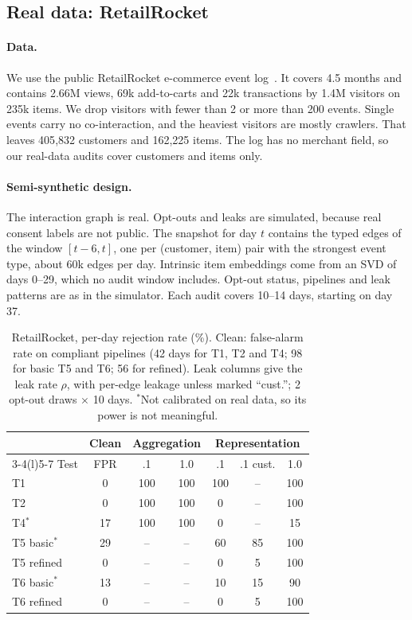 \documentclass[10pt,twocolumn,letterpaper]{article}
\theoremstyle{definition}
\begin{document}
\subsection{Real data: RetailRocket}\label{sec:real}
\paragraph{Data.}
We use the public RetailRocket e-commerce event log~\citep{retailrocket}. It
covers 4.5 months and contains 2.66M views, 69k add-to-carts and 22k
transactions by 1.4M visitors on 235k items. We drop visitors with fewer than
2 or more than 200 events. Single events carry no co-interaction, and the
heaviest visitors are mostly crawlers. That leaves 405{,}832 customers and
162{,}225 items. The log has no merchant field, so our real-data audits cover
customers and items only.

\paragraph{Semi-synthetic design.}
The interaction graph is real. Opt-outs and leaks are simulated, because real
consent labels are not public. The snapshot for day $t$ contains the typed edges
of the window $[t-6,t]$, one per (customer, item) pair with the strongest event
type, about 60k edges per day. Intrinsic item embeddings come from an SVD of
days 0--29, which no audit window includes. Opt-out status, pipelines and leak
patterns are as in the simulator. Each audit covers 10--14 days, starting on
day 37.

\begin{table}[t]
\centering\footnotesize
\setlength{\tabcolsep}{3pt}
\begin{tabular}{@{}lcccccc@{}}
\toprule
 & Clean & \multicolumn{2}{c}{Aggregation} & \multicolumn{3}{c}{Representation} \\
\cmidrule(lr){3-4}\cmidrule(l){5-7}
Test & FPR & .1 & 1.0 & .1 & .1 cust. & 1.0 \\
\midrule
T1 & 0 & 100 & 100 & 100 & -- & 100 \\
T2 & 0 & 100 & 100 & 0 & -- & 100 \\
T4$^*$ & 17 & 100 & 100 & 0 & -- & 15 \\
T5 basic$^*$ & 29 & -- & -- & 60 & 85 & 100 \\
T5 refined & 0 & -- & -- & 0 & 5 & 100 \\
T6 basic$^*$ & 13 & -- & -- & 10 & 15 & 90 \\
T6 refined & 0 & -- & -- & 0 & 5 & 100 \\
\bottomrule
\end{tabular}
\caption{RetailRocket, per-day rejection rate (\%). Clean: false-alarm rate on compliant pipelines (42 days for T1, T2 and T4; 98 for basic T5 and T6; 56 for refined). Leak columns give the leak rate $\rho$, with per-edge leakage unless marked ``cust.''; 2 opt-out draws $\times$ 10 days. $^*$Not calibrated on real data, so its power is not meaningful.}
\label{tab:real}
\end{table}
\end{document}
